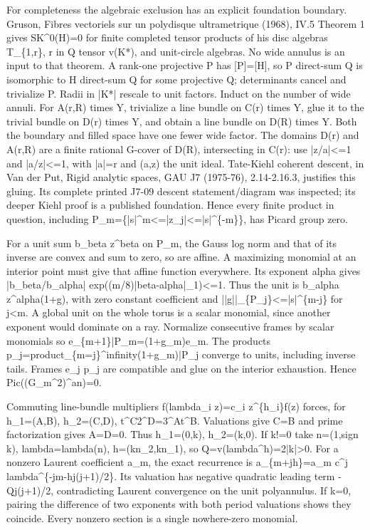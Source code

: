 \documentclass[11pt]{article}
\begin{document}
For completeness the algebraic exclusion has an explicit foundation boundary. Gruson, Fibres vectoriels sur un polydisque ultrametrique (1968), IV.5 Theorem 1 gives SK\textasciicircum{}0(H)=0 for finite completed tensor products of his disc algebras T\_\{1,r\}, r in Q tensor v(K*), and unit-circle algebras. No wide annulus is an input to that theorem. A rank-one projective P has [P]=[H], so P direct-sum Q is isomorphic to H direct-sum Q for some projective Q; determinants cancel and trivialize P. Radii in |K*| rescale to unit factors. Induct on the number of wide annuli. For A(r,R) times Y, trivialize a line bundle on C(r) times Y, glue it to the trivial bundle on D(r) times Y, and obtain a line bundle on D(R) times Y. Both the boundary and filled space have one fewer wide factor. The domains D(r) and A(r,R) are a finite rational G-cover of D(R), intersecting in C(r): use |z/a|<=1 and |a/z|<=1, with |a|=r and (a,z) the unit ideal. Tate-Kiehl coherent descent, in Van der Put, Rigid analytic spaces, GAU J7 (1975-76), 2.14-2.16.3, justifies this gluing. Its complete printed J7-09 descent statement/diagram was inspected; its deeper Kiehl proof is a published foundation. Hence every finite product in question, including P\_m=\{|s|\textasciicircum{}m<=|z\_j|<=|s|\textasciicircum{}\{-m\}\}, has Picard group zero.

For a unit sum b\_beta z\textasciicircum{}beta on P\_m, the Gauss log norm and that of its inverse are convex and sum to zero, so are affine. A maximizing monomial at an interior point must give that affine function everywhere. Its exponent alpha gives |b\_beta/b\_alpha| exp((m/8)|beta-alpha|\_1)<=1. Thus the unit is b\_alpha z\textasciicircum{}alpha(1+g), with zero constant coefficient and ||g||\_\{P\_j\}<=|s|\textasciicircum{}\{m-j\} for j<m. A global unit on the whole torus is a scalar monomial, since another exponent would dominate on a ray. Normalize consecutive frames by scalar monomials so e\_\{m+1\}|P\_m=(1+g\_m)e\_m. The products p\_j=product\_\{m=j\}\textasciicircum{}infinity(1+g\_m)|P\_j converge to units, including inverse tails. Frames e\_j p\_j are compatible and glue on the interior exhaustion. Hence Pic((G\_m\textasciicircum{}2)\textasciicircum{}an)=0.

Commuting line-bundle multipliers f(lambda\_i z)=c\_i z\textasciicircum{}\{h\_i\}f(z) forces, for h\_1=(A,B), h\_2=(C,D), t\textasciicircum{}C2\textasciicircum{}D=3\textasciicircum{}At\textasciicircum{}B. Valuations give C=B and prime factorization gives A=D=0. Thus h\_1=(0,k), h\_2=(k,0). If k!=0 take n=(1,sign k), lambda=lambda(n), h=(kn\_2,kn\_1), so Q=v(lambda\textasciicircum{}h)=2|k|>0. For a nonzero Laurent coefficient a\_m, the exact recurrence is a\_\{m+jh\}=a\_m c\textasciicircum{}j lambda\textasciicircum{}\{-jm-hj(j+1)/2\}. Its valuation has negative quadratic leading term -Qj(j+1)/2, contradicting Laurent convergence on the unit polyannulus. If k=0, pairing the difference of two exponents with both period valuations shows they coincide. Every nonzero section is a single nowhere-zero monomial.
\end{document}

